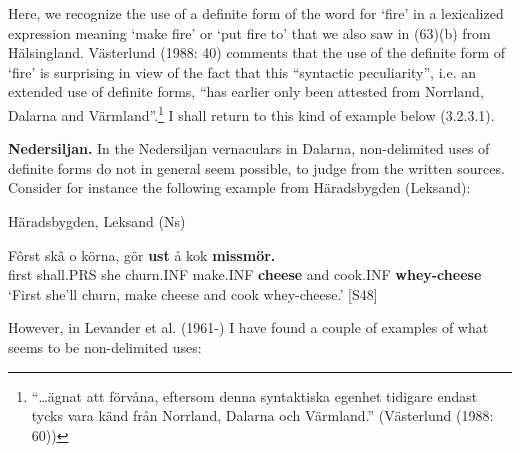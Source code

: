 \z

Here, we recognize the use of a definite form of the word for ‘fire’ in a lexicalized expression meaning ‘make fire’ or ‘put fire to’ that we also saw in (63)(b) from Hälsingland. Västerlund (1988: 40) comments that the use of the definite form of  ‘fire’ is surprising in view of the fact that this “syntactic peculiarity”, i.e. an extended use of definite forms, “has earlier only been attested from Norrland, Dalarna and Värmland”.\footnote{ “…ägnat att förvåna, eftersom denna syntaktiska egenhet tidigare endast tycks vara känd från Norrland, Dalarna och Värmland.” (Västerlund (1988: 60))} I shall return to this kind of example below (3.2.3.1).


\textbf{Nedersiljan.} In the Nedersiljan vernaculars in Dalarna, non-delimited uses of definite forms do not in general seem possible, to judge from the written sources. Consider for instance the following example from Häradsbygden (Leksand):


\item 

Häradsbygden, Leksand (Ns) 



 \ea\label{}
\gll Fôrst  skâ  o  körna,  gör  \textbf{ust} å  kok  \textbf{missmör.} \\


first  shall.PRS  she  churn.INF  make.INF  \textbf{cheese} and  cook.INF  \textbf{whey-cheese} \\

\glt ‘First she’ll churn, make cheese and cook whey-cheese.’ [S48]

\z

However, in Levander et al. (1961-) I have found a couple of examples of what seems to be non-delimited uses:

